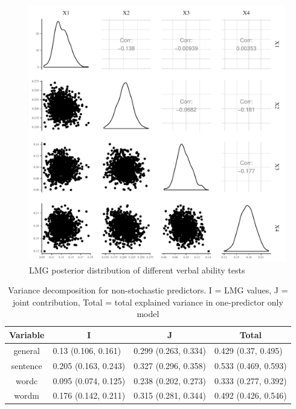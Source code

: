 \documentclass[11pt,a4paper,twoside]{book}
\makeatletter
\def\maxwidth{ %
  \ifdim\Gin@nat@width>\linewidth
    \linewidth
  \else
    \Gin@nat@width
  \fi
}
\newenvironment{knitrout}{}{} %
\makeatother
\begin{document}
\begin{knitrout}
\color{fgcolor}\begin{figure}
\includegraphics[width=\maxwidth]{figure/ch03_figempi_lmg_plot-1} \caption[LMG posterior distribution of different verbal ability tests]{LMG posterior distribution of different verbal ability tests}\label{fig:empi.lmg.plot}
\end{figure}


\end{knitrout}


\begin{table}[h]
\caption{Variance decomposition for non-stochastic predictors. I = LMG values, J = joint contribution, Total = total explained variance in one-predictor only model}
\centering
\begin{tabular}{clll}
  \toprule
  \multicolumn{1}{c}{\textbf{Variable}} & \multicolumn{1}{c}{\textbf{I}} &\multicolumn{1}{c}{\textbf{J}} & \multicolumn{1}{c}{\textbf{Total}} \\
  \hline
general & 0.13 (0.106, 0.161)  & 0.299 (0.263, 0.334)   & 0.429 (0.37, 0.495)  \\ 
sentence & 0.205 (0.163, 0.243)  & 0.327 (0.296, 0.358)   & 0.533 (0.469, 0.593)  \\ 
wordc & 0.095 (0.074, 0.125)  & 0.238 (0.202, 0.273)   & 0.333 (0.277, 0.392)  \\ 
wordm & 0.176 (0.142, 0.211)  & 0.315 (0.281, 0.344)   & 0.492 (0.426, 0.546)  \\ 
   \bottomrule
\end{tabular}
\label{tbl:empirical.ijt}
\end{table}
\end{document}
